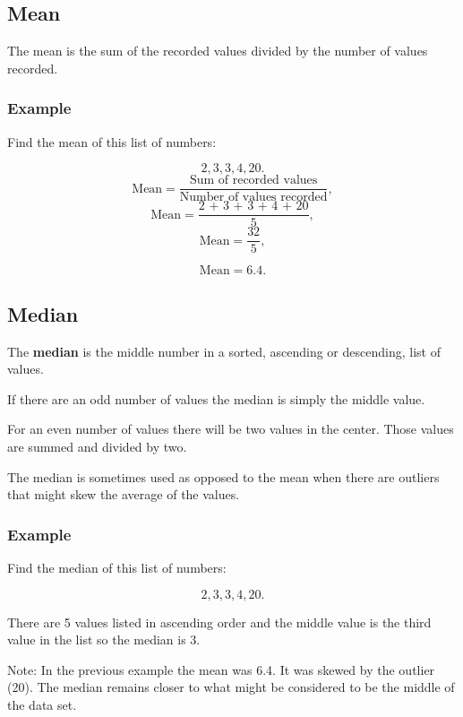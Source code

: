 \documentclass[
]{book}
\begin{document}
\hypertarget{mean}{%
\subsection{Mean}\label{mean}}

The mean is the sum of the recorded values divided by the number of values recorded.

\hypertarget{example}{%
\subsubsection{Example}\label{example}}

Find the mean of this list of numbers:

\[ 2, 3, 3, 4, 20.\]
\[ \textrm{Mean} = \frac{\textrm{Sum of recorded values}}{\textrm{Number of values recorded}},\]
\[ \textrm{Mean} = \frac{\textrm{2 + 3 + 3 + 4 + 20}}{\textrm{5}},\]
\[ \textrm{Mean} = \frac{\textrm{32}}{\textrm{5}},\]

\[ \textrm{Mean} = 6.4.\]

\hypertarget{median}{%
\subsection{Median}\label{median}}

The \textbf{median} is the middle number in a sorted, ascending or descending, list of values.

If there are an odd number of values the median is simply the middle value.

For an even number of values there will be two values in the center. Those values are summed and divided by two.

The median is sometimes used as opposed to the mean when there are outliers that might skew the average of the values.

\hypertarget{example-1}{%
\subsubsection{Example}\label{example-1}}

Find the median of this list of numbers:

\[ 2, 3, 3, 4, 20.\]

There are 5 values listed in ascending order and the middle value is the third value in the list so the median is 3.

Note: In the previous example the mean was 6.4. It was skewed by the outlier (20). The median remains closer to what might be considered to be the middle of the data set.
\end{document}
